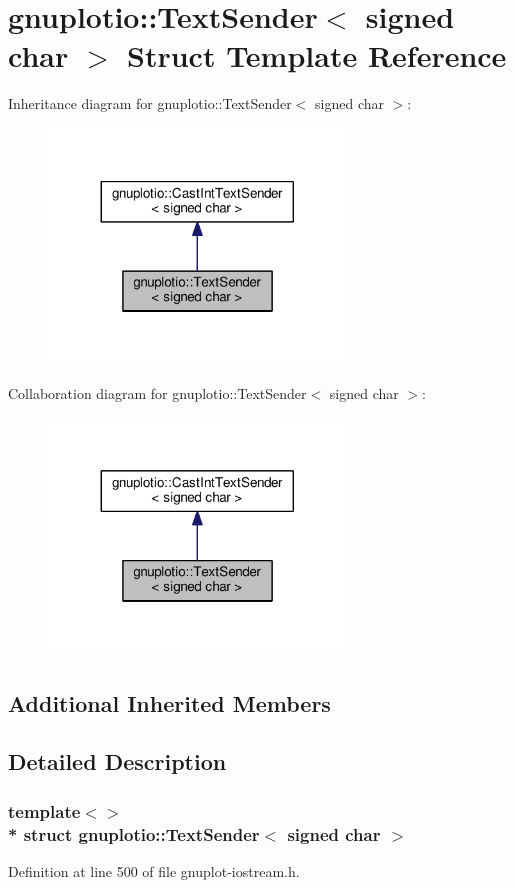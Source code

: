 \hypertarget{structgnuplotio_1_1_text_sender_3_01signed_01char_01_4}{}\section{gnuplotio\+:\+:Text\+Sender$<$ signed char $>$ Struct Template Reference}
\label{structgnuplotio_1_1_text_sender_3_01signed_01char_01_4}


Inheritance diagram for gnuplotio\+:\+:Text\+Sender$<$ signed char $>$\+:\nopagebreak
\begin{figure}[H]
\begin{center}
\leavevmode
\includegraphics[width=224pt]{structgnuplotio_1_1_text_sender_3_01signed_01char_01_4__inherit__graph}
\end{center}
\end{figure}


Collaboration diagram for gnuplotio\+:\+:Text\+Sender$<$ signed char $>$\+:\nopagebreak
\begin{figure}[H]
\begin{center}
\leavevmode
\includegraphics[width=224pt]{structgnuplotio_1_1_text_sender_3_01signed_01char_01_4__coll__graph}
\end{center}
\end{figure}
\subsection*{Additional Inherited Members}


\subsection{Detailed Description}
\subsubsection*{template$<$$>$\\*
struct gnuplotio\+::\+Text\+Sender$<$ signed char $>$}



Definition at line 500 of file gnuplot-\/iostream.\+h.

